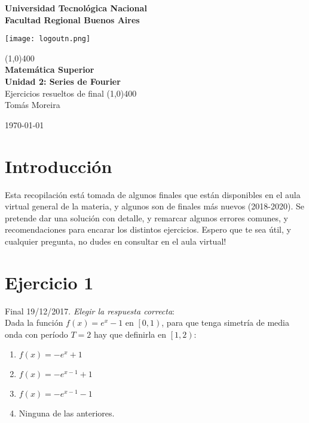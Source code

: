 \documentclass[11pt]{article}
\begin{document}
		
	\begin{titlepage}
		\begin{center}
			\vspace*{0.5cm}
			\Large{\textbf{Universidad Tecnológica Nacional}}\\
			\Large{\textbf{Facultad Regional Buenos Aires}}\\
			\begin{center}
				\texttt{[image: logoutn.png]}
			\end{center}
			\vfill
			\line(1,0){400}\\
			\vspace*{0.3cm}
			\huge{\textbf{Matemática Superior}}\\
			\Large{\textbf{Unidad 2: Series de Fourier}}\\
			\large{Ejercicios resueltos de final}
			\line(1,0){400}\\
			\vfill
			Tomás Moreira \\
			
			
			\today
				
				
		\end{center}
	\end{titlepage}

	\tableofcontents
	\thispagestyle{empty}
	\clearpage

	\setcounter{page}{1}
	\section{Introducción}
	Esta recopilación está tomada de algunos finales que están disponibles en el aula virtual general de la materia, y algunos son de finales más nuevos (2018-2020). Se pretende dar una solución con detalle, y remarcar algunos errores comunes, y recomendaciones para encarar los distintos ejercicios. Espero que te sea útil, y cualquier pregunta, no dudes en consultar en el aula virtual!
	\section{Ejercicio 1}
	Final 19/12/2017. \textit{Elegir la respuesta correcta}:\\
	Dada la función $f(x)=e^{x}-1$ en $\left[0,1\right)$, para que tenga simetría de media onda con período $T=2$ hay que definirla en $\left[1,2\right)$:
	\renewcommand{\labelenumi}{\alph{enumi})}
	\begin{enumerate}
		\item $f(x)=-e^{x}+1$
		\item $f(x)=-e^{x-1}+1$
		\item $f(x)=-e^{x-1}-1$
		\item Ninguna de las anteriores.
	\end{enumerate}
\end{document}
